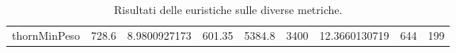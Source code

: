\begin{sidewaystable}[]
\begin{tabular}{l|c|c|c|c|c|c|c|c}
thornMinPeso        & 728.6                & 8.9800927173                                                     & 601.35                                                                      & 5384.8                                                                     & 3400               & 12.3660130719                                                  & 644                                                                     & 199                                                                   
\end{tabular}
\caption{Risultati delle euristiche sulle diverse metriche.}
\label{tab:results}
\end{sidewaystable}
